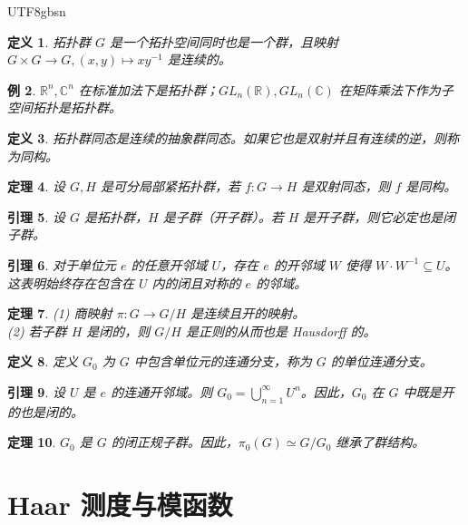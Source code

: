 \documentclass[11pt]{article}
\newtheorem{theorem}{定理}[section]
\newtheorem{lemma}[theorem]{引理}
\newtheorem{definition}[theorem]{定义}
\newtheorem{example}[theorem]{例}
\begin{document}
\begin{CJK*}{UTF8}{gbsn}
\begin{definition}
拓扑群 $G$ 是一个拓扑空间同时也是一个群，且映射 $G \times G \to G, (x, y) \mapsto xy^{-1}$ 是连续的。
\end{definition}

\begin{example}
$\mathbb{R}^n, \mathbb{C}^n$ 在标准加法下是拓扑群；$GL_n(\mathbb{R}), GL_n(\mathbb{C})$ 在矩阵乘法下作为子空间拓扑是拓扑群。
\end{example}

\begin{definition}
拓扑群同态是连续的抽象群同态。如果它也是双射并且有连续的逆，则称为同构。
\end{definition}

\begin{theorem}
设 $G, H$ 是可分局部紧拓扑群，若 $f: G \to H$ 是双射同态，则 $f$ 是同构。
\end{theorem}

\begin{lemma}
设 $G$ 是拓扑群，$H$ 是子群（开子群）。若 $H$ 是开子群，则它必定也是闭子群。
\end{lemma}

\begin{lemma}
对于单位元 $e$ 的任意开邻域 $U$，存在 $e$ 的开邻域 $W$ 使得 $W \cdot W^{-1} \subseteq U$。这表明始终存在包含在 $U$ 内的闭且对称的 $e$ 的邻域。
\end{lemma}

\begin{theorem}
(1) 商映射 $\pi: G \to G/H$ 是连续且开的映射。\\
(2) 若子群 $H$ 是闭的，则 $G/H$ 是正则的从而也是 Hausdorff 的。
\end{theorem}

\begin{definition}
定义 $G_0$ 为 $G$ 中包含单位元的连通分支，称为 $G$ 的单位连通分支。
\end{definition}

\begin{lemma}
设 $U$ 是 $e$ 的连通开邻域。则 $G_0 = \bigcup_{n=1}^\infty U^n$。因此，$G_0$ 在 $G$ 中既是开的也是闭的。
\end{lemma}

\begin{theorem}
$G_0$ 是 $G$ 的闭正规子群。因此，$\pi_0(G) \simeq G/G_0$ 继承了群结构。
\end{theorem}

\section{Haar 测度与模函数}


\end{CJK*}
\end{document}
